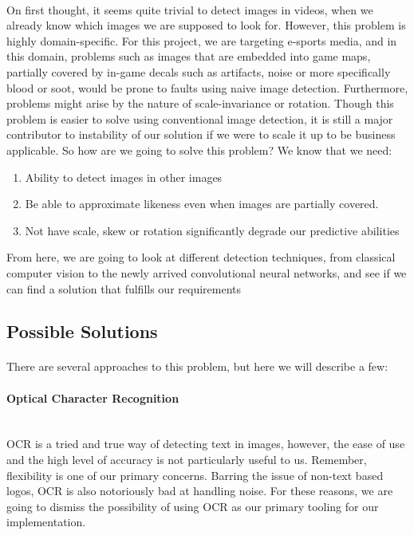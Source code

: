 \documentclass{article}
\begin{document}
\paragraph{}
On first thought, it seems quite trivial to detect images 
in videos, when we already know which images we are supposed
to look for. However, this problem is highly domain-specific.
For this project, we are targeting e-sports media, and in this domain,
problems such as images that are embedded
into game maps, partially covered by in-game decals such as
artifacts, noise or more specifically blood or soot, would
be prone to faults using naive image detection.  
\newline\newline
Furthermore, problems might arise by the nature of
scale-invariance or rotation.  
Though this problem is easier to solve using conventional
image detection, it is still a major contributor to instability
of our solution if we were to scale it up to be business
applicable.  So how are we going to solve this problem? 
We know that we need:

\begin{enumerate}
  \item Ability to detect images in other images
  \item Be able to approximate likeness even when images are partially covered. 
  \item Not have scale, skew or rotation significantly degrade our predictive abilities
\end{enumerate}
From here, we are going to look at different detection
techniques, from classical computer vision to the newly
arrived convolutional neural networks, and see if we can
find a solution that fulfills our requirements


\subsection{Possible Solutions}
\paragraph{}
There are several approaches to this problem, but here we will describe a few:
\paragraph{Optical Character Recognition} \mbox{}\\

OCR is a tried and true way of detecting text in images,
however, the ease of use and the high level of accuracy is
not particularly useful to us. Remember, flexibility is one
of our primary concerns.  Barring the issue of non-text based
logos, OCR is also notoriously bad at handling noise. For
these reasons, we are going to dismiss the possibility of
using OCR as our primary tooling for our implementation.
\end{document}
